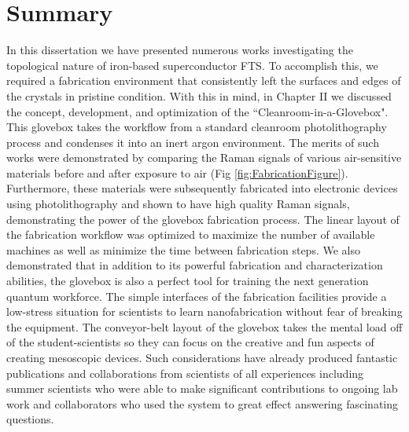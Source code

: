 \section{Summary}
In this dissertation we have presented numerous works investigating the topological nature of iron-based superconductor \acl{FTS}. To accomplish this, we required a fabrication environment that consistently left the surfaces and edges of the crystals in pristine condition. With this in mind, in Chapter II we discussed the concept, development, and optimization of the ``Cleanroom-in-a-Glovebox". This glovebox takes the workflow from a standard cleanroom photolithography process and condenses it into an inert argon environment. The merits of such works were demonstrated by comparing the Raman signals of various air-sensitive materials before and after exposure to air (Fig \ref{fig:FabricationFigure}). Furthermore, these materials were subsequently fabricated into electronic devices using photolithography and shown to have high quality Raman signals, demonstrating the power of the glovebox fabrication process. The linear layout of the fabrication workflow was optimized to maximize the number of available machines as well as minimize the time between fabrication steps. We also demonstrated that in addition to its powerful fabrication and characterization abilities, the glovebox is also a perfect tool for training the next generation quantum workforce. The simple interfaces of the fabrication facilities provide a low-stress situation for scientists to learn nanofabrication without fear of breaking the equipment. The conveyor-belt layout of the glovebox takes the mental load off of the student-scientists so they can focus on the creative and fun aspects of creating mesoscopic devices. Such considerations have already produced fantastic publications and collaborations from scientists of all experiences including summer scientists who were able to make significant contributions to ongoing lab work\cite{Gray2019, KUMAR2020112123, Gray2020} and collaborators who used the system to great effect answering fascinating questions\cite{WangBalgley2020, Kumar2020, lei2019high, Brotons-Gisbert2019, YaoCGT2Dmat}.\par
